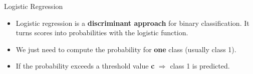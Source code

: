 \documentclass[11pt,compress,t,notes=noshow, xcolor=table]{beamer}
\begin{document}

\begin{vbframe}{Logistic Regression}

\begin{itemize}
\item \small Logistic regression is a \textbf{discriminant approach} for binary classification. It turns scores into probabilities with the logistic function.
\item \small We just need to compute the probability for \textbf{one} class (usually class 1).
\item \small If the probability exceeds a threshold value \textbf{c} $\Rightarrow$ class 1 is predicted.
\end{itemize}


\end{vbframe}
\end{document}
